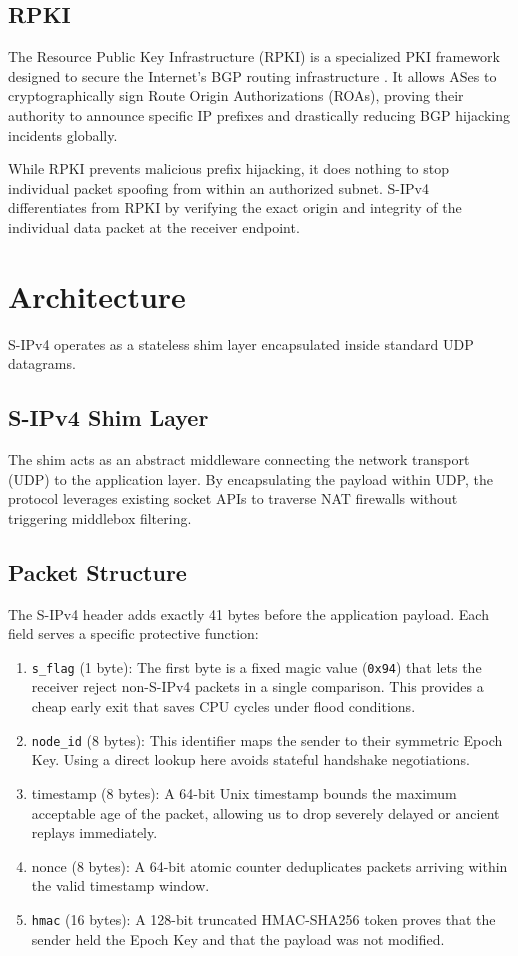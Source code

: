 \documentclass[journal]{IEEEtran}
\begin{document}
\subsection{RPKI}
The Resource Public Key Infrastructure (RPKI) is a specialized PKI framework designed to secure the Internet's BGP routing infrastructure \cite{lepinski2012rpki}. It allows ASes to cryptographically sign Route Origin Authorizations (ROAs), proving their authority to announce specific IP prefixes and drastically reducing BGP hijacking incidents globally.

While RPKI prevents malicious prefix hijacking, it does nothing to stop individual packet spoofing from within an authorized subnet. S-IPv4 differentiates from RPKI by verifying the exact origin and integrity of the individual data packet at the receiver endpoint.

\section{Architecture}
\label{sec:architecture}
S-IPv4 operates as a stateless shim layer encapsulated inside standard UDP datagrams.

\subsection{S-IPv4 Shim Layer}
The shim acts as an abstract middleware connecting the network transport (UDP) to the application layer. By encapsulating the payload within UDP, the protocol leverages existing socket APIs to traverse NAT firewalls without triggering middlebox filtering.

\subsection{Packet Structure}
The S-IPv4 header adds exactly 41 bytes before the application payload. Each field serves a specific protective function:
\begin{enumerate}
    \item \texttt{s\_flag} (1 byte): The first byte is a fixed magic value (\texttt{0x94}) that lets the receiver reject non-S-IPv4 packets in a single comparison. This provides a cheap early exit that saves CPU cycles under flood conditions.
    \item \texttt{node\_id} (8 bytes): This identifier maps the sender to their symmetric Epoch Key. Using a direct lookup here avoids stateful handshake negotiations.
    \item timestamp (8 bytes): A 64-bit Unix timestamp bounds the maximum acceptable age of the packet, allowing us to drop severely delayed or ancient replays immediately.
    \item nonce (8 bytes): A 64-bit atomic counter deduplicates packets arriving within the valid timestamp window.
    \item \texttt{hmac} (16 bytes): A 128-bit truncated HMAC-SHA256 token proves that the sender held the Epoch Key and that the payload was not modified.
\end{enumerate}
\end{document}
